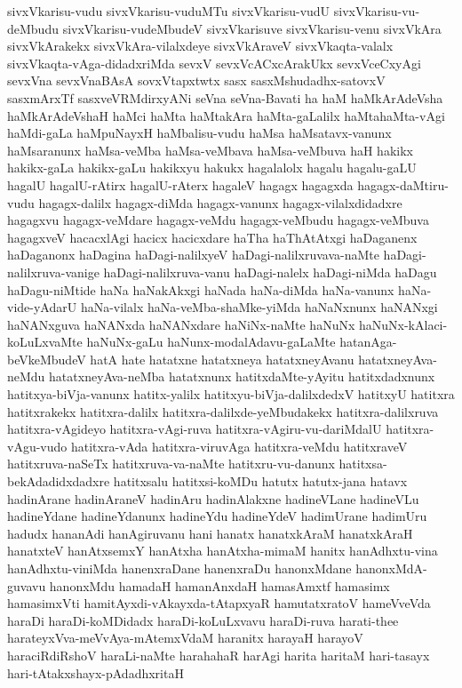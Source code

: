 {sivxVkarisu-vudu
sivxVkarisu-vuduMTu
sivxVkarisu-vudU
sivxVkarisu-vu-deMbudu
sivxVkarisu-vudeMbudeV
sivxVkarisuve
sivxVkarisu-venu
sivxVkAra
sivxVkArakekx
sivxVkAra-vilalxdeye
sivxVkAraveV
sivxVkaqta-valalx
sivxVkaqta-vAga-didadxriMda
sevxV
sevxVcACxcArakUkx
sevxVceCxyAgi
sevxVna
sevxVnaBAsA
sovxVtapxtwtx
sasx
sasxMshudadhx-satovxV
sasxmArxTf
sasxveVRMdirxyANi
seVna
seVna-Bavati
ha
haM
haMkArAdeVsha
haMkArAdeVshaH
haMci
haMta
haMtakAra
haMta-gaLalilx
haMtahaMta-vAgi
haMdi-gaLa
haMpuNayxH
haMbalisu-vudu
haMsa
haMsatavx-vanunx
haMsaranunx
haMsa-veMba
haMsa-veMbava
haMsa-veMbuva
haH
hakikx
hakikx-gaLa
hakikx-gaLu
hakikxyu
hakukx
hagalalolx
hagalu
hagalu-gaLU
hagalU
hagalU-rAtirx
hagalU-rAterx
hagaleV
hagagx
hagagxda
hagagx-daMtiru-vudu
hagagx-dalilx
hagagx-diMda
hagagx-vanunx
hagagx-vilalxdidadxre
hagagxvu
hagagx-veMdare
hagagx-veMdu
hagagx-veMbudu
hagagx-veMbuva
hagagxveV
hacacxlAgi
hacicx
hacicxdare
haTha
haThAtAtxgi
haDaganenx
haDaganonx
haDagina
haDagi-nalilxyeV
haDagi-nalilxruvava-naMte
haDagi-nalilxruva-vanige
haDagi-nalilxruva-vanu
haDagi-nalelx
haDagi-niMda
haDagu
haDagu-niMtide
haNa
haNakAkxgi
haNada
haNa-diMda
haNa-vanunx
haNa-vide-yAdarU
haNa-vilalx
haNa-veMba-shaMke-yiMda
haNaNxnunx
haNANxgi
haNANxguva
haNANxda
haNANxdare
haNiNx-naMte
haNuNx
haNuNx-kAlaci-koLuLxvaMte
haNuNx-gaLu
haNunx-modalAdavu-gaLaMte
hatanAga-beVkeMbudeV
hatA
hate
hatatxne
hatatxneya
hatatxneyAvanu
hatatxneyAva-neMdu
hatatxneyAva-neMba
hatatxnunx
hatitxdaMte-yAyitu
hatitxdadxnunx
hatitxya-biVja-vanunx
hatitx-yalilx
hatitxyu-biVja-dalilxdedxV
hatitxyU
hatitxra
hatitxrakekx
hatitxra-dalilx
hatitxra-dalilxde-yeMbudakekx
hatitxra-dalilxruva
hatitxra-vAgideyo
hatitxra-vAgi-ruva
hatitxra-vAgiru-vu-dariMdalU
hatitxra-vAgu-vudo
hatitxra-vAda
hatitxra-viruvAga
hatitxra-veMdu
hatitxraveV
hatitxruva-naSeTx
hatitxruva-va-naMte
hatitxru-vu-danunx
hatitxsa-bekAdadidxdadxre
hatitxsalu
hatitxsi-koMDu
hatutx
hatutx-jana
hatavx
hadinArane
hadinAraneV
hadinAru
hadinAlakxne
hadineVLane
hadineVLu
hadineYdane
hadineYdanunx
hadineYdu
hadineYdeV
hadimUrane
hadimUru
hadudx
hananAdi
hanAgiruvanu
hani
hanatx
hanatxkAraM
hanatxkAraH
hanatxteV
hanAtxsemxY
hanAtxha
hanAtxha-mimaM
hanitx
hanAdhxtu-vina
hanAdhxtu-viniMda
hanenxraDane
hanenxraDu
hanonxMdane
hanonxMdA-guvavu
hanonxMdu
hamadaH
hamanAnxdaH
hamasAmxtf
hamasimx
hamasimxVti
hamitAyxdi-vAkayxda-tAtapxyaR
hamutatxratoV
hameVveVda
haraDi
haraDi-koMDidadx
haraDi-koLuLxvavu
haraDi-ruva
harati-thee
harateyxVva-meVvAya-mAtemxVdaM
haranitx
harayaH
harayoV
haraciRdiRshoV
haraLi-naMte
harahahaR
harAgi
harita
haritaM
hari-tasayx
hari-tAtakxshayx-pAdadhxritaH
}
